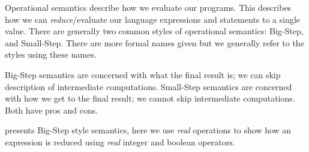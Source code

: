 Operational semantics describe how we evaluate our programs.
This describes how we can \emph{reduce}/evaluate our language expressions and statements to a single value.
There are generally two common styles of operational semantics: Big-Step, and Small-Step.
There are more formal names given but we generally refer to the styles using these names.

Big-Step semantics are concerned with what the final result is; we can skip description of intermediate computations.
Small-Step semantics are concerned with how we get to the final result; we cannot skip intermediate computations.
Both have pros and cons.

 presents Big-Step style semantics, here we use \emph{real} operations to show how an expression is reduced using \emph{real} integer and boolean operators.
